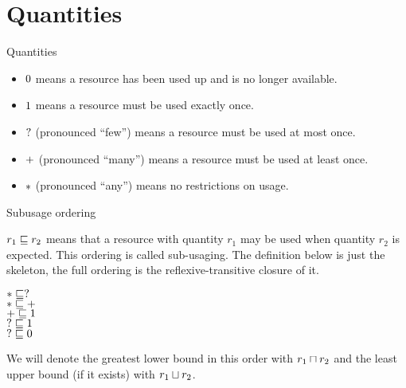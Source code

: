 \section{Quantities}

\begin{frame}{Quantities}

\begin{itemize}
  \item $0$ means a resource has been used up and is no longer available.
  \item $1$ means a resource must be used exactly once.
  \item $?$ (pronounced ``few'') means a resource must be used at most once.
  \item $+$ (pronounced ``many'') means a resource must be used at least once.
  \item $*$ (pronounced ``any'') means no restrictions on usage.
\end{itemize}

\end{frame}

\begin{frame}{Subusage ordering}

$r_1 \sqsubseteq r_2$ means that a resource with quantity $r_1$ may be used when quantity $r_2$ is expected. This ordering is called sub-usaging. The definition below is just the skeleton, the full ordering is the reflexive-transitive closure of it.

\begin{center}
  $* \sqsubseteq ?$ \\
  $* \sqsubseteq +$ \\
  $+ \sqsubseteq 1$ \\
  $? \sqsubseteq 1$ \\
  $? \sqsubseteq 0$
\end{center}

\vspace{2em}

We will denote the greatest lower bound in this order with $r_1 \sqcap r_2$ and the least upper bound (if it exists) with $r_1 \sqcup r_2$.

\end{frame}


